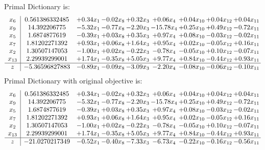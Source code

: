 \documentclass[9pt]{article}
\begin{document}
Primal Dictionary is:
\[\begin{array}{c| c c@{\hskip 2pt} c@{\hskip 2pt} c@{\hskip 2pt} c@{\hskip 2pt} c@{\hskip 2pt} c@{\hskip 2pt} c@{\hskip 2pt} }
 x_{6}   &  0.561386332485 & +  0.34 x_{1} & -0.02 x_{8} & +  0.32 x_{3} & +  0.06 x_{4} & +  0.04 x_{10} & +  0.04 x_{12} & +  0.04 x_{11}\\
 x_{9}   &  14.392206775 & -5.32 x_{1} & -0.77 x_{8} & -2.20 x_{3} & -15.78 x_{4} & +  0.25 x_{10} & +  0.49 x_{12} & -0.72 x_{11}\\
 x_{5}   &  1.6874877619 & -0.39 x_{1} & +  0.03 x_{8} & +  0.35 x_{3} & +  0.97 x_{4} & +  0.08 x_{10} & -0.03 x_{12} & -0.02 x_{11}\\
 x_{7}   &  1.81202271392 & +  0.93 x_{1} & +  0.06 x_{8} & +  1.64 x_{3} & +  0.95 x_{4} & +  0.02 x_{10} & -0.05 x_{12} & +  0.16 x_{11}\\
 x_{2}   &  1.30507147053 & -1.00 x_{1} & +  0.02 x_{8} & -0.22 x_{3} & -0.78 x_{4} & -0.05 x_{10} & +  0.10 x_{12} & -0.07 x_{11}\\
 x_{13}   &  2.29939299001 & +  1.74 x_{1} & -0.35 x_{8} & +  5.05 x_{3} & +  9.77 x_{4} & +  0.84 x_{10} & -0.44 x_{12} & +  0.93 x_{11}\\
\hline
z    &  -5.36596827883 & -0.89 x_{1} & -0.09 x_{8} & -3.09 x_{3} & -2.20 x_{4} & -0.08 x_{10} & -0.06 x_{12} & -0.10 x_{11}\\
\end{array}\]
Primal Dictionary with original objective is:
\[\begin{array}{c| c c@{\hskip 2pt} c@{\hskip 2pt} c@{\hskip 2pt} c@{\hskip 2pt} c@{\hskip 2pt} c@{\hskip 2pt} c@{\hskip 2pt} }
 x_{6}   &  0.561386332485 & +  0.34 x_{1} & -0.02 x_{8} & +  0.32 x_{3} & +  0.06 x_{4} & +  0.04 x_{10} & +  0.04 x_{12} & +  0.04 x_{11}\\
 x_{9}   &  14.392206775 & -5.32 x_{1} & -0.77 x_{8} & -2.20 x_{3} & -15.78 x_{4} & +  0.25 x_{10} & +  0.49 x_{12} & -0.72 x_{11}\\
 x_{5}   &  1.6874877619 & -0.39 x_{1} & +  0.03 x_{8} & +  0.35 x_{3} & +  0.97 x_{4} & +  0.08 x_{10} & -0.03 x_{12} & -0.02 x_{11}\\
 x_{7}   &  1.81202271392 & +  0.93 x_{1} & +  0.06 x_{8} & +  1.64 x_{3} & +  0.95 x_{4} & +  0.02 x_{10} & -0.05 x_{12} & +  0.16 x_{11}\\
 x_{2}   &  1.30507147053 & -1.00 x_{1} & +  0.02 x_{8} & -0.22 x_{3} & -0.78 x_{4} & -0.05 x_{10} & +  0.10 x_{12} & -0.07 x_{11}\\
 x_{13}   &  2.29939299001 & +  1.74 x_{1} & -0.35 x_{8} & +  5.05 x_{3} & +  9.77 x_{4} & +  0.84 x_{10} & -0.44 x_{12} & +  0.93 x_{11}\\
\hline
z    &  -21.0270217349 & -0.52 x_{1} & -0.40 x_{8} & -7.33 x_{3} & -6.73 x_{4} & -0.22 x_{10} & -0.16 x_{12} & -0.56 x_{11}\\
\end{array}\]
\end{document}
